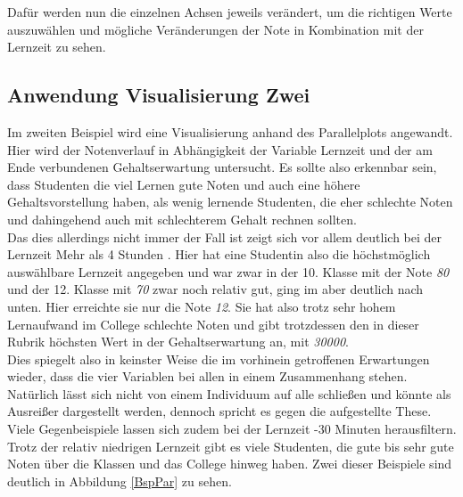 \documentclass[usegeometry=true]{scrartcl}
\begin{document}
\noindent Dafür werden nun die einzelnen Achsen jeweils verändert, um die richtigen Werte auszuwählen und mögliche  Veränderungen der Note in Kombination mit der Lernzeit zu sehen.


\subsection{Anwendung Visualisierung Zwei}
\label{AnwZwei}
Im zweiten Beispiel wird eine Visualisierung anhand des Parallelplots angewandt. Hier wird der Notenverlauf in Abhängigkeit der Variable Lernzeit und der am Ende verbundenen Gehaltserwartung untersucht. Es sollte also erkennbar sein, dass Studenten die viel Lernen gute Noten und auch eine höhere Gehaltsvorstellung haben, als wenig lernende Studenten, die eher schlechte Noten und dahingehend auch mit schlechterem Gehalt rechnen sollten.\\

\noindent Das dies allerdings nicht immer der Fall ist zeigt sich vor allem deutlich bei der Lernzeit \glqq Mehr als 4 Stunden \grqq . Hier hat eine Studentin also die höchstmöglich auswählbare Lernzeit angegeben und war zwar in der 10. Klasse mit der Note \textit{80} und der 12. Klasse mit \textit{70} zwar noch relativ gut, ging im aber deutlich nach unten. Hier erreichte sie nur die Note \textit{12}. Sie hat also trotz sehr hohem Lernaufwand im College schlechte Noten und gibt trotzdessen den in dieser Rubrik höchsten Wert in der Gehaltserwartung an, mit \textit{30000}.\\

\noindent Dies spiegelt also in keinster Weise die im vorhinein getroffenen Erwartungen wieder, dass die vier Variablen bei allen in einem Zusammenhang stehen.\\
Natürlich lässt sich nicht von einem Individuum auf alle schließen und könnte als Ausreißer dargestellt werden, dennoch spricht es gegen die aufgestellte These.\\

\noindent Viele Gegenbeispiele lassen sich zudem bei der Lernzeit -30 Minuten herausfiltern\grqq . Trotz der relativ niedrigen Lernzeit gibt es viele Studenten, die gute bis sehr gute Noten über die Klassen und das College hinweg haben. Zwei dieser Beispiele sind deutlich in Abbildung \ref{BspPar} zu sehen.
\end{document}
